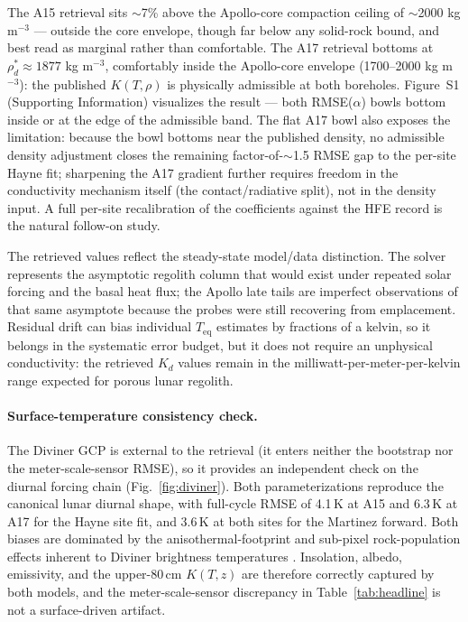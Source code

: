\documentclass[11pt]{article}
\newcommand{\zborestem}{80\,\si{\centi\meter}}
\begin{document}
The A15 retrieval sits $\sim$7\% above the Apollo-core compaction ceiling
of $\sim$2000 kg m$^{-3}$ \citep{mitchell1973,carrier1991} --- outside the
core envelope, though far below any solid-rock bound, and best read as
marginal rather than comfortable. The A17 retrieval bottoms
at $\rho_d^{*}\approx 1877$ kg m$^{-3}$, comfortably inside the
Apollo-core envelope (1700--2000 kg m$^{-3}$): the published
$K(T,\rho)$ is physically admissible at both boreholes.
Figure~S1 (Supporting Information) visualizes the result --- both
RMSE($\alpha$) bowls bottom inside or at the edge of the admissible
band. The flat A17 bowl also exposes the limitation: because the bowl
bottoms near the published density, no admissible density adjustment
closes the remaining factor-of-$\sim$1.5 RMSE gap to the per-site
Hayne fit; sharpening the A17 gradient further requires freedom in the
conductivity mechanism itself (the contact/radiative split), not in
the density input. A full per-site recalibration of the
\citet{martinez2021} coefficients against the HFE record is the
natural follow-on study.


The retrieved values reflect the steady-state model/data distinction. The
solver represents the asymptotic regolith column that would exist under
repeated solar forcing and the basal heat flux; the Apollo late tails are
imperfect observations of that same asymptote because the probes were still
recovering from emplacement. Residual drift can bias individual
$T_\mathrm{eq}$ estimates by fractions of a kelvin, so it belongs in the
systematic error budget, but it does not require an unphysical conductivity:
the retrieved $K_d$ values remain in the milliwatt-per-meter-per-kelvin
range expected for porous lunar regolith.

\paragraph*{Surface-temperature consistency check.}
The Diviner GCP is external to the retrieval (it enters neither the
bootstrap nor the meter-scale-sensor RMSE), so it
provides an independent check on the diurnal forcing chain
(Fig.~\ref{fig:diviner}). Both parameterizations reproduce the canonical
lunar diurnal shape, with full-cycle RMSE of 4.1\,K at A15 and 6.3\,K at A17 for the Hayne
site fit, and 3.6\,K at both sites for the Martinez forward. Both
biases are dominated by the anisothermal-footprint and
sub-pixel rock-population effects inherent to Diviner brightness
temperatures \citep{bandfield2015,hayne2017}. Insolation, albedo,
emissivity, and the upper-$\zborestem$ $K(T,z)$ are therefore correctly
captured by both models, and the
meter-scale-sensor discrepancy in
Table~\ref{tab:headline} is not a surface-driven artifact.
\end{document}
